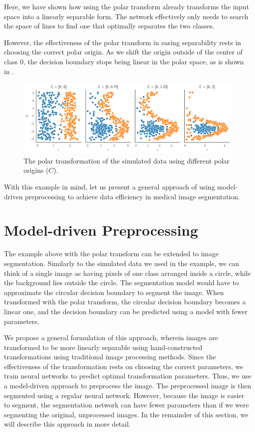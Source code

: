 Here, we have shown how using the polar transform already transforms the input space into a linearly separable form. The network effectively only needs to search the space of lines to find one that optimally separates the two classes.

However, the effectiveness of the polar transform in easing separability rests in choosing the correct polar origin. As we shift the origin outside of the center of class 0, the decision boundary stops being linear in the polar space, as is shown in .

 	\begin{figure}[h]
		\centering
		\includegraphics[width=\linewidth]{images/4/data_polar_origin}
		\caption{The polar transformation of the simulated data using different polar origins ($C$).}
		\label{fig:polar-origin-selection}
	\end{figure}
	
With this example in mind, let us present a general approach of using model-driven preprocessing to achieve data efficiency in medical image segmentation.
	
\section{Model-driven Preprocessing}

The example above with the polar transform can be extended to image segmentation. Similarly to the simulated data we used in the example, we can think of a single image as having pixels of one class arranged inside a circle, while the background lies outside the circle. The segmentation model would have to approximate the circular decision boundary to segment the image. When transformed with the polar transform, the circular decision boundary becomes a linear one, and the decision boundary can be predicted using a model with fewer parameters. 

We propose a general formulation of this approach, wherein images are transformed to be more linearly separable using hand-constructed transformations using traditional image processing methods. Since the effectiveness of the transformation rests on choosing the correct parameters, we train neural networks to predict optimal transformation parameters. Thus, we use a model-driven approach to preprocess the image. The preprocessed image is then segmented using a regular neural network. However, because the image is easier to segment, the segmentation network can have fewer parameters than if we were segmenting the original, unprocessed images. In the remainder of this section, we will describe this approach in more detail.


